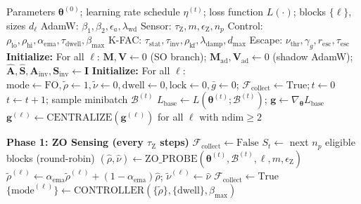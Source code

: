\documentclass[conference]{IEEEtran}
\begin{document}
\begin{algorithm*}[!t]
\footnotesize
\caption{Trinity Optimization Framework}
\label{alg:trinity}
\begin{algorithmic}[1]
\Require Parameters $\boldsymbol{\theta}^{(0)}$; learning rate schedule $\eta^{(t)}$; loss function $L(\cdot)$; blocks $\{\ell\}$, sizes $d_\ell$
\Require AdamW: $\beta_1, \beta_2, \epsilon_a, \lambda_{\mathrm{wd}}$
\Require Sensor: $\tau_{\mathrm{Z}}, m, \epsilon_{\mathrm{Z}}, n_p$
\Require Control: $\rho_{\mathrm{lo}}, \rho_{\mathrm{hi}}, \alpha_{\mathrm{ema}}, \tau_{\mathrm{dwell}}, \beta_{\mathrm{max}}$
\Require K-FAC: $\tau_{\mathrm{stat}}, \tau_{\mathrm{inv}}, \rho_{\mathrm{kf}}, \lambda_{\mathrm{damp}}, d_{\mathrm{max}}$
\Require Escape: $\nu_{\mathrm{thr}}, \gamma_g, r_{\mathrm{esc}}, \tau_{\mathrm{esc}}$
\State \textbf{Initialize:} For all $\ell$: $\mathbf{M}, \mathbf{V} \leftarrow 0$ (SO branch); $\mathbf{M}_{\mathrm{ad}}, \mathbf{V}_{\mathrm{ad}} \leftarrow 0$ (shadow AdamW); $\hat{\mathbf{A}}, \hat{\mathbf{S}}, \mathbf{A}_{\mathrm{inv}}, \mathbf{S}_{\mathrm{inv}} \leftarrow \mathbf{I}$
\State \textbf{Initialize:} For all $\ell$: $\mathrm{mode} \leftarrow \mathrm{FO}, \tilde{\rho} \leftarrow 1, \tilde{\nu} \leftarrow 0, \mathrm{dwell} \leftarrow 0, \mathrm{lock} \leftarrow 0, \bar{g} \leftarrow 0$; $\mathcal{F}_{\mathrm{collect}} \leftarrow \mathrm{True}; t \leftarrow 0$
    \State $t \leftarrow t + 1$; sample minibatch $\mathcal{B}^{(t)}$
    \State $L_{\mathrm{base}} \leftarrow L(\boldsymbol{\theta}^{(t)}; \mathcal{B}^{(t)})$; $\mathbf{g} \leftarrow \nabla_{\boldsymbol{\theta}} L_{\mathrm{base}}$ 
        \State $\mathbf{g}^{(\ell)} \leftarrow \mathrm{CENTRALIZE}(\mathbf{g}^{(\ell)})$ for all $\ell$ with $\mathrm{ndim} \ge 2$
    \EndIf

    \Statex \textbf{Phase 1: ZO Sensing (every $\tau_{\mathrm{Z}}$ steps)}
        \State $\mathcal{F}_{\mathrm{collect}} \leftarrow \mathrm{False}$ 
        \State $S_t \leftarrow$ next $n_p$ eligible blocks (round-robin)
            \State $(\hat{\rho}, \hat{\nu}) \leftarrow \mathrm{ZO\_PROBE}(\boldsymbol{\theta}^{(t)}, \mathcal{B}^{(t)}, \ell, m, \epsilon_{\mathrm{Z}})$ 
            \State $\tilde{\rho}^{(\ell)} \leftarrow \alpha_{\mathrm{ema}} \tilde{\rho}^{(\ell)} + (1-\alpha_{\mathrm{ema}}) \hat{\rho}$; $\tilde{\nu}^{(\ell)} \leftarrow \hat{\nu}$
        \EndFor
        \State $\mathcal{F}_{\mathrm{collect}} \leftarrow \mathrm{True}$
        \State $\{\mathrm{mode}^{(\ell)}\} \leftarrow \mathrm{CONTROLLER}(\{\tilde{\rho}\}, \{\mathrm{dwell}\}, \beta_{\mathrm{max}})$
    \EndIf


\end{algorithmic}
\end{algorithm*}
\end{document}
